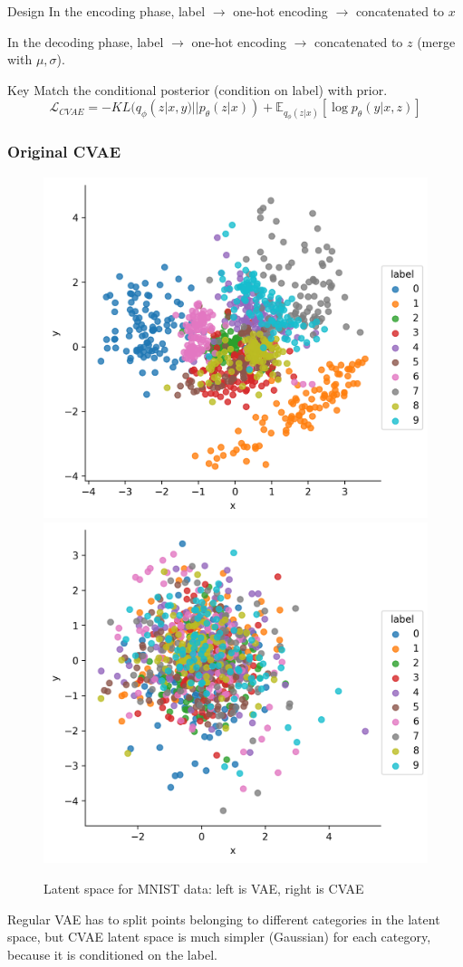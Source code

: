 \documentclass{beamer}
\begin{document}
\begin{frame}
\begin{frame}
\begin{frame}
\begin{frame}
\begin{frame}
\begin{block}{Design}
In the encoding phase, label $\rightarrow$ one-hot encoding $\rightarrow$ concatenated to $x$ 

In the decoding phase, label $\rightarrow$ one-hot encoding $\rightarrow$ concatenated to $z$ (merge with $\mu,\sigma$).
\end{block}

\begin{block}{Key}
Match the conditional posterior (condition on label) with prior.
\[
\mathcal{L}_{CVAE} = -KL(q_\phi(z|x, y)||p_\theta(z|x)) + \mathbb{E}_{q_\phi(z|x)}[\log p_\theta(y|x, z)]
\]
\end{block}
\end{frame}

\begin{frame}
\frametitle{Original CVAE}

\begin{figure}
\includegraphics[width=0.45\linewidth]{figs/cvae_vae.png}
\includegraphics[width=0.45\linewidth]{figs/cvae_cvae.png}
\caption{Latent space for MNIST data: left is VAE, right is CVAE}
\end{figure}

Regular VAE has to split points belonging to different categories in the latent space, but CVAE latent space is much simpler (Gaussian) for each category, because it is conditioned on the label.


\end{frame}


\end{frame}
\end{frame}
\end{frame}
\end{frame}
\end{document}
